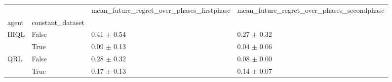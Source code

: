 \begin{tabular}{llll}
\toprule
 &  & mean_future_regret_over_phases_firstphase & mean_future_regret_over_phases_secondphase \\
agent & constant_dataset &  &  \\
\midrule
\multirow[t]{2}{*}{HIQL} & False & 0.41 $\pm$ 0.54 & 0.27 $\pm$ 0.32 \\
 & True & 0.09 $\pm$ 0.13 & 0.04 $\pm$ 0.06 \\
\cline{1-4}
\multirow[t]{2}{*}{QRL} & False & 0.28 $\pm$ 0.32 & 0.08 $\pm$ 0.00 \\
 & True & 0.17 $\pm$ 0.13 & 0.14 $\pm$ 0.07 \\
\cline{1-4}
\bottomrule
\end{tabular}
